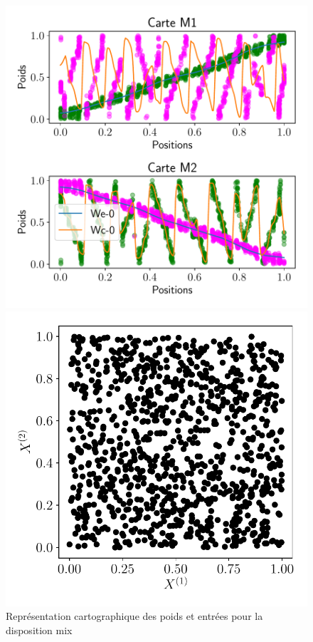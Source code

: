 \documentclass[../main]{subfiles}
\begin{document}
\begin{figure}
	\begin{minipage}{0.66\textwidth}
		\includegraphics[width=\textwidth]{2som_square_w.pdf}
	\caption{Représentation cartographique des poids et entrées pour la disposition mix}
	\end{minipage}
	\begin{minipage}{0.33\textwidth}
		\includegraphics[width=\textwidth]{2som_square_in.pdf}
	\end{minipage}
\end{figure}
\end{document}
